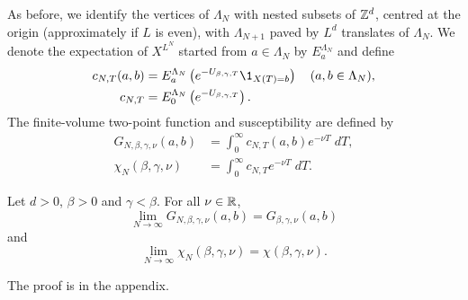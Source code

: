 As before, we identify the vertices of $\Lambda_N$ with nested subsets of ${ {{\mathbb Z}}^d }$,
centred at the origin (approximately if $L$ is even),
with $\Lambda_{N+1}$ paved by $L^d$ translates of $\Lambda_N$.
We denote the expectation of $X^{L^N}$ started from $a \in \Lambda_N$ by $E^{\Lambda_N}_a$
and define
\begin{align}
\label{e:cN}
c_{N,T}(a, b)
    &= E^{\Lambda_N}_a \left( e^{-U_{\beta,\gamma,T}} \1_{X(T)=b} \right)
    \quad (a, b \in \Lambda_N), \\
c_{N,T}
    &= E^{\Lambda_N}_0 \left( e^{-U_{\beta,\gamma,T}} \right).
\end{align}
The finite-volume two-point function and susceptibility
are defined by
\begin{align}
G_{N,\beta,\gamma,\nu}(a,b)
    &= \int_0^\infty c_{N,T}(a, b) e^{-\nu T} \; dT, \\
\chi_N(\beta, \gamma, \nu)
    &= \int_0^\infty c_{N,T} e^{-\nu T} \; dT
    .
    \label{e:chiNdef}
\end{align}

\begin{prop}
\label{prop:finvol}
Let $d >0$, $\beta >0$ and $\gamma < \beta$. For all $\nu \in {\mathbb R}$,
\begin{equation}
\label{e:Givlc}
\lim_{N \to \infty}
G_{N,\beta,\gamma,\nu}(a,b)
=
G_{\beta,\gamma,\nu}(a,b)
\end{equation}
and
\begin{equation}
\label{e:chilim}
\lim_{N\to\infty}\chi_N(\beta,\gamma,\nu)=   \chi(\beta,\gamma,\nu).
\end{equation}
\end{prop}

The proof is in the appendix.